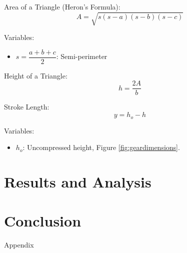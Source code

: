 \documentclass{article}
\begin{document}
Area of a Triangle (Heron's Formula):
\begin{equation}
    A = \sqrt{s(s-a)(s-b)(s-c)}
\end{equation}

Variables:
\begin{itemize}
    \item \(s = \dfrac{a+b+c}{2}\): Semi-perimeter
\end{itemize}
\vspace{5mm}

Height of a Triangle:
\begin{equation}
    h = \dfrac{2A}{b}
\end{equation}

Stroke Length:
\begin{equation}
    y = h_{o} - h
\end{equation}

Variables:
\begin{itemize}
    \item \(h_{o}\): Uncompressed height, Figure \ref{fig:geardimensions}. 
\end{itemize}
\vspace{5mm}
\section{Results and Analysis}

 
\section{Conclusion}



\newpage
\thispagestyle{empty}  %
\begin{center}
	\vspace*{\fill}
	{\Huge Appendix}
	\vspace*{\fill}
\end{center}
\end{document}
